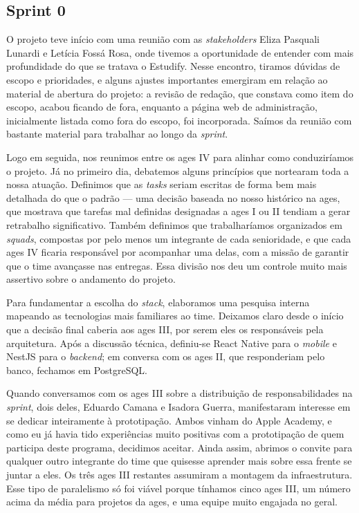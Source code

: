 \subsection{Sprint 0}

O projeto teve início com uma reunião com as \textit{stakeholders} Eliza Pasquali Lunardi e Letícia Fossá Rosa, onde tivemos a oportunidade de entender com mais profundidade do que se tratava o Estudify. Nesse encontro, tiramos dúvidas de escopo e prioridades, e alguns ajustes importantes emergiram em relação ao material de abertura do projeto: a revisão de redação, que constava como item do escopo, acabou ficando de fora, enquanto a página web de administração, inicialmente listada como fora do escopo, foi incorporada. Saímos da reunião com bastante material para trabalhar ao longo da \textit{sprint}.

Logo em seguida, nos reunimos entre os \ac{ages} IV para alinhar como conduziríamos o projeto. Já no primeiro dia, debatemos alguns princípios que nortearam toda a nossa atuação. Definimos que as \textit{tasks} seriam escritas de forma bem mais detalhada do que o padrão --- uma decisão baseada no nosso histórico na \ac{ages}, que mostrava que tarefas mal definidas designadas a \ac{ages} I ou II tendiam a gerar retrabalho significativo. Também definimos que trabalharíamos organizados em \textit{squads}, compostas por pelo menos um integrante de cada senioridade, e que cada \ac{ages} IV ficaria responsável por acompanhar uma delas, com a missão de garantir que o time avançasse nas entregas. Essa divisão nos deu um controle muito mais assertivo sobre o andamento do projeto.

Para fundamentar a escolha do \textit{stack}, elaboramos uma pesquisa interna mapeando as tecnologias mais familiares ao time. Deixamos claro desde o início que a decisão final caberia aos \ac{ages} III, por serem eles os responsáveis pela arquitetura. Após a discussão técnica, definiu-se React Native para o \textit{mobile} e NestJS para o \textit{backend}; em conversa com os \ac{ages} II, que responderiam pelo banco, fechamos em PostgreSQL.

Quando conversamos com os \ac{ages} III sobre a distribuição de responsabilidades na \textit{sprint}, dois deles, Eduardo Camana e Isadora Guerra, manifestaram interesse em se dedicar inteiramente à prototipação. Ambos vinham do Apple Academy, e como eu já havia tido experiências muito positivas com a prototipação de quem participa deste programa, decidimos aceitar. Ainda assim, abrimos o convite para qualquer outro integrante do time que quisesse aprender mais sobre essa frente se juntar a eles. Os três \ac{ages} III restantes assumiram a montagem da infraestrutura. Esse tipo de paralelismo só foi viável porque tínhamos cinco \ac{ages} III, um número acima da média para projetos da \ac{ages}, e uma equipe muito engajada no geral.

